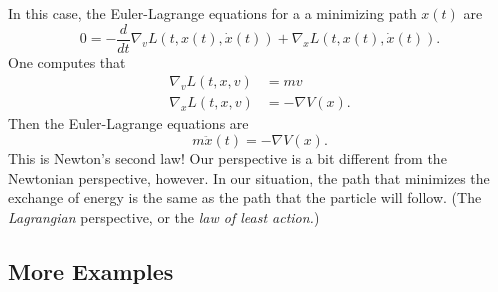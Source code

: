 \documentclass[11pt]{book}
\begin{document}
In this case, the Euler-Lagrange equations for a a minimizing path $x(t)$ are
\[
0 = -\frac{d}{dt} \nabla_v L(t, x(t), \dot{x}(t)) + \nabla_x L(t, x(t), \dot{x}(t)).
\]
One computes that 
\begin{align*}
\nabla_v L(t,x,v) &= mv \\
\nabla_x L(t,x,v) &= -\nabla V(x).
\end{align*}
Then the Euler-Lagrange equations are
\[
\boxed{m \ddot{x}(t) = -\nabla V(x).}
\]
This is Newton's second law! Our perspective is a bit different from the Newtonian perspective, however. In our situation, the path that minimizes the exchange of energy is the same as the path that the particle will follow. (The \emph{Lagrangian} perspective, or the \emph{law of least action.})

\subsection{More Examples}
\end{document}
